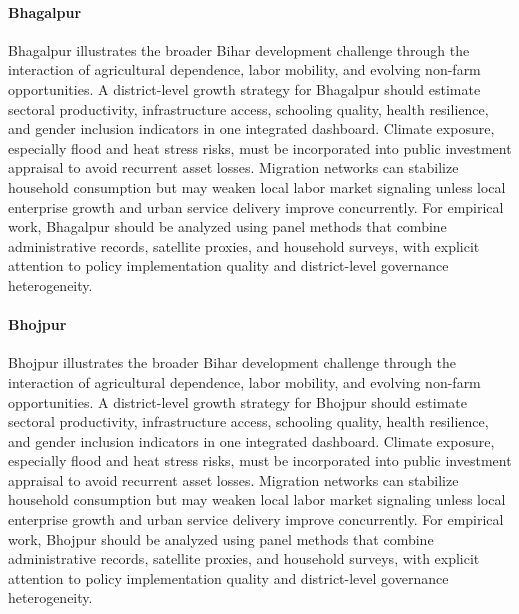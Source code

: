 \documentclass[preprint,12pt]{elsarticle}
\begin{document}
\paragraph{Bhagalpur} Bhagalpur illustrates the broader Bihar development challenge through the interaction of agricultural dependence, labor mobility, and evolving non-farm opportunities. A district-level growth strategy for Bhagalpur should estimate sectoral productivity, infrastructure access, schooling quality, health resilience, and gender inclusion indicators in one integrated dashboard. Climate exposure, especially flood and heat stress risks, must be incorporated into public investment appraisal to avoid recurrent asset losses. Migration networks can stabilize household consumption but may weaken local labor market signaling unless local enterprise growth and urban service delivery improve concurrently. For empirical work, Bhagalpur should be analyzed using panel methods that combine administrative records, satellite proxies, and household surveys, with explicit attention to policy implementation quality and district-level governance heterogeneity.

\paragraph{Bhojpur} Bhojpur illustrates the broader Bihar development challenge through the interaction of agricultural dependence, labor mobility, and evolving non-farm opportunities. A district-level growth strategy for Bhojpur should estimate sectoral productivity, infrastructure access, schooling quality, health resilience, and gender inclusion indicators in one integrated dashboard. Climate exposure, especially flood and heat stress risks, must be incorporated into public investment appraisal to avoid recurrent asset losses. Migration networks can stabilize household consumption but may weaken local labor market signaling unless local enterprise growth and urban service delivery improve concurrently. For empirical work, Bhojpur should be analyzed using panel methods that combine administrative records, satellite proxies, and household surveys, with explicit attention to policy implementation quality and district-level governance heterogeneity.
\end{document}
